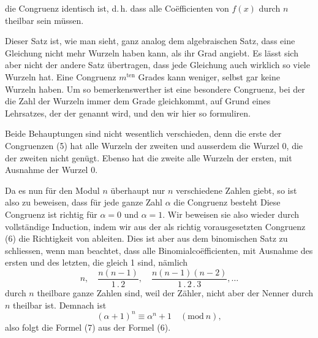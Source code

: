 die Congruenz identisch ist, d.\,h. dass alle Co\"efficienten von $f(x)$
durch $n$ theilbar sein m\"ussen.

Dieser Satz ist, wie man sieht, ganz analog dem algebraischen Satz, dass eine Gleichung nicht mehr Wurzeln haben
kann, als ihr Grad angiebt. Es l\"asst sich aber nicht der andere
Satz \"ubertragen, dass jede Gleichung auch wirklich so viele
Wurzeln hat. Eine Congruenz $m^{\text{ten}}$ Grades kann weniger, selbst
gar keine Wurzeln haben. Um so bemerkenswerther ist eine
besondere Congruenz, bei der die Zahl der Wurzeln immer dem
Grade gleichkommt, auf Grund eines Lehrsatzes, der der  genannt wird, und den wir hier so formuliren.


Beide Behauptungen sind nicht wesentlich verschieden, denn
die erste der Congruenzen (5) hat alle Wurzeln der zweiten und
ausserdem die Wurzel 0, die der zweiten nicht gen\"ugt. Ebenso
hat die zweite alle Wurzeln der ersten, mit Ausnahme der
Wurzel 0.

Da es nun f\"ur den Modul $n$ \"uberhaupt nur $n$ verschiedene
Zahlen giebt, so ist also zu beweisen, dass f\"ur jede ganze Zahl
$\alpha$ die Congruenz besteht
Diese Congruenz ist richtig f\"ur $\alpha = 0$ und $\alpha = 1$. Wir
beweisen sie also wieder durch vollst\"andige Induction, indem wir
aus der als richtig vorausgesetzten Congruenz (6) die Richtigkeit von
ableiten. Dies ist aber aus dem binomischen Satz zu schliessen,
wenn man beachtet, dass alle Binomialco\"efficienten, mit Ausnahme des ersten und des letzten, die gleich 1 sind, n\"amlich
\[
n, \quad \frac{n(n-1)}{1\,.\,2}, \quad \frac{n(n-1)(n-2)}{1\,.\,2\,.\,3}, \dots
\]
durch $n$ theilbare ganze Zahlen sind, weil der Z\"ahler, nicht aber
der Nenner durch $n$ theilbar ist. Demnach ist
\[
(\alpha + 1)^n \equiv \alpha^n + 1 \quad (\mathrm{mod}\ n),
\]
also folgt die Formel (7) aus der Formel (6).
